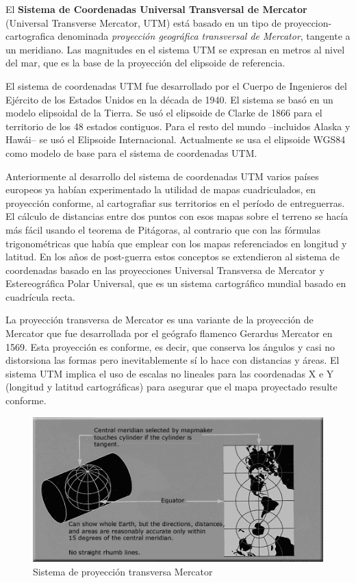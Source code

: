 \documentclass[a4paper,12pt,twoside]{article}
\begin{document}
El \textbf{Sistema de Coordenadas Universal Transversal de Mercator} (Universal Transverse Mercator, UTM) est\'a basado en un tipo de \gls{proyeccion-cartografica} denominada \emph{proyecci\'on geogr\'afica transversal de Mercator}, tangente a un meridiano. Las magnitudes en el sistema UTM se expresan en metros al nivel del mar, que es la base de la proyecci\'on del elipsoide de referencia.

El sistema de coordenadas UTM fue desarrollado por el Cuerpo de Ingenieros del Ejército de los Estados Unidos en la década de 1940. El sistema se basó en un modelo elipsoidal de la Tierra. Se usó el elipsoide de Clarke de 1866 para el territorio de los 48 estados contiguos. Para el resto del mundo –incluidos Alaska y Hawái– se usó el Elipsoide Internacional. Actualmente se usa el elipsoide WGS84 como modelo de base para el sistema de coordenadas UTM.

Anteriormente al desarrollo del sistema de coordenadas UTM varios países europeos ya habían experimentado la utilidad de mapas cuadriculados, en proyección conforme, al cartografiar sus territorios en el período de entreguerras. El cálculo de distancias entre dos puntos con esos mapas sobre el terreno se hacía más fácil usando el teorema de Pitágoras, al contrario que con las fórmulas trigonométricas que había que emplear con los mapas referenciados en longitud y latitud. En los años de post-guerra estos conceptos se extendieron al sistema de coordenadas basado en las proyecciones Universal Transversa de Mercator y Estereográfica Polar Universal, que es un sistema cartográfico mundial basado en cuadrícula recta.

La proyección transversa de Mercator es una variante de la proyección de Mercator que fue desarrollada por el geógrafo flamenco Gerardus Mercator en 1569. Esta proyección es conforme, es decir, que conserva los ángulos y casi no distorsiona las formas pero inevitablemente sí lo hace con distancias y áreas. El sistema UTM implica el uso de escalas no lineales para las coordenadas X e Y (longitud y latitud cartográficas) para asegurar que el mapa proyectado resulte conforme.

\begin{figure}[!htb]
  \centering
  \includegraphics[width=\textwidth]{./Imagenes/Usgs_map_traverse_mercator.png}
  \caption{Sistema de proyecci\'on transversa Mercator}
  \label{fig:sistema.proyeccion.transversa.mercator}
\end{figure}
\end{document}
